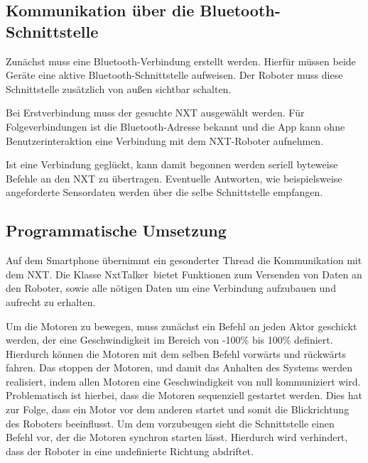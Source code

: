 \subsection{Kommunikation über die Bluetooth-Schnittstelle}

Zunächst muss eine Bluetooth-Verbindung erstellt werden. Hierfür müssen beide Geräte eine aktive Bluetooth-Schnittstelle aufweisen. Der Roboter muss diese Schnittstelle zusätzlich von außen sichtbar schalten.

Bei Erstverbindung muss der gesuchte NXT ausgewählt werden. Für Folgeverbindungen ist die Bluetooth-Adresse bekannt und die App kann ohne Benutzerinteraktion eine Verbindung mit dem NXT-Roboter aufnehmen.

Ist eine Verbindung geglückt, kann damit begonnen werden seriell byteweise Befehle an den NXT zu übertragen. Eventuelle Antworten, wie beispielsweise angeforderte Sensordaten werden über die selbe Schnittstelle empfangen.

\subsection{Programmatische Umsetzung}

Auf dem Smartphone übernimmt ein gesonderter Thread die Kommunikation mit dem NXT. Die Klasse \glqq NxtTalker\grqq\ bietet Funktionen zum Versenden von Daten an den Roboter, sowie alle nötigen Daten um eine Verbindung aufzubauen und aufrecht zu erhalten.

Um die Motoren zu bewegen, muss zunächst ein Befehl an jeden Aktor geschickt werden, der eine Geschwindigkeit im Bereich von -100\% bis 100\% definiert. Hierdurch können die Motoren mit dem selben Befehl vorwärts und rückwärts fahren. Das stoppen der Motoren, und damit das Anhalten des Systems werden realisiert, indem allen Motoren eine Geschwindigkeit von null kommuniziert wird. Problematisch ist hierbei, dass die Motoren sequenziell gestartet werden. Dies hat zur Folge, dass ein Motor vor dem anderen startet und somit die Blickrichtung des Roboters beeinflusst. Um dem vorzubeugen sieht die Schnittstelle einen Befehl vor, der die Motoren synchron starten lässt. Hierdurch wird verhindert, dass der Roboter in eine undefinierte Richtung abdriftet.
